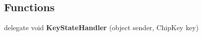 \subsection*{Functions}
\begin{DoxyCompactItemize}
\item 
\hypertarget{namespace_eimu_1_1_core_1_1_systems_1_1_s_chip8_ad88b9f415a8fa8f42c4d2104a292206c}{
delegate void {\bfseries KeyStateHandler} (object sender, ChipKey key)}
\label{namespace_eimu_1_1_core_1_1_systems_1_1_s_chip8_ad88b9f415a8fa8f42c4d2104a292206c}

\end{DoxyCompactItemize}
